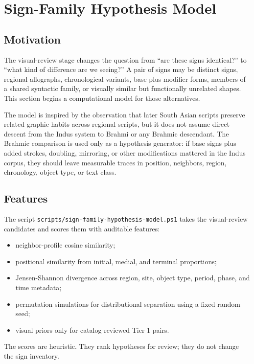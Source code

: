\section{Sign-Family Hypothesis Model}

\subsection{Motivation}

The visual-review stage changes the question from ``are these signs identical?'' to ``what kind of difference are we seeing?'' A pair of signs may be distinct signs, regional allographs, chronological variants, base-plus-modifier forms, members of a shared syntactic family, or visually similar but functionally unrelated shapes. This section begins a computational model for those alternatives.

The model is inspired by the observation that later South Asian scripts preserve related graphic habits across regional scripts, but it does not assume direct descent from the Indus system to Brahmi or any Brahmic descendant. The Brahmic comparison is used only as a hypothesis generator: if base signs plus added strokes, doubling, mirroring, or other modifications mattered in the Indus corpus, they should leave measurable traces in position, neighbors, region, chronology, object type, or text class.

\subsection{Features}

The script \texttt{scripts/sign-family-hypothesis-model.ps1} takes the visual-review candidates and scores them with auditable features:

\begin{itemize}
  \item neighbor-profile cosine similarity;
  \item positional similarity from initial, medial, and terminal proportions;
  \item Jensen-Shannon divergence across region, site, object type, period, phase, and time metadata;
  \item permutation simulations for distributional separation using a fixed random seed;
  \item visual priors only for catalog-reviewed Tier 1 pairs.
\end{itemize}

The scores are heuristic. They rank hypotheses for review; they do not change the sign inventory.


